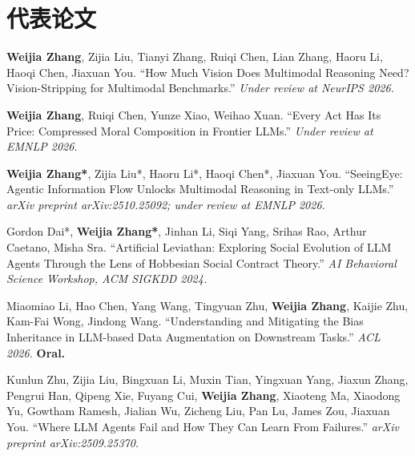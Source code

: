 \section{代表论文}
\begin{itemize}[leftmargin=0.15in, label={}]
  \small{
    \item \textbf{Weijia Zhang}, Zijia Liu, Tianyi Zhang, Ruiqi Chen, Lian Zhang, Haoru Li, Haoqi Chen, Jiaxuan You.
    ``How Much Vision Does Multimodal Reasoning Need? Vision-Stripping for Multimodal Benchmarks.''
    \textit{Under review at NeurIPS 2026.}

    \item \textbf{Weijia Zhang}, Ruiqi Chen, Yunze Xiao, Weihao Xuan.
    ``Every Act Has Its Price: Compressed Moral Composition in Frontier LLMs.''
    \textit{Under review at EMNLP 2026.}

    \item \textbf{Weijia Zhang*}, Zijia Liu*, Haoru Li*, Haoqi Chen*, Jiaxuan You.
    ``SeeingEye: Agentic Information Flow Unlocks Multimodal Reasoning in Text-only LLMs.''
    \textit{arXiv preprint arXiv:2510.25092; under review at EMNLP 2026.}

    \item Gordon Dai*, \textbf{Weijia Zhang*}, Jinhan Li, Siqi Yang, Srihas Rao, Arthur Caetano, Misha Sra.
    ``Artificial Leviathan: Exploring Social Evolution of LLM Agents Through the Lens of Hobbesian Social Contract Theory.''
    \textit{AI Behavioral Science Workshop, ACM SIGKDD 2024.}

    \item Miaomiao Li, Hao Chen, Yang Wang, Tingyuan Zhu, \textbf{Weijia Zhang}, Kaijie Zhu, Kam-Fai Wong, Jindong Wang.
    ``Understanding and Mitigating the Bias Inheritance in LLM-based Data Augmentation on Downstream Tasks.''
    \textit{ACL 2026.} \textbf{Oral.}

    \item Kunlun Zhu, Zijia Liu, Bingxuan Li, Muxin Tian, Yingxuan Yang, Jiaxun Zhang, Pengrui Han, Qipeng Xie,
    Fuyang Cui, \textbf{Weijia Zhang}, Xiaoteng Ma, Xiaodong Yu, Gowtham Ramesh, Jialian Wu, Zicheng Liu, Pan Lu, James Zou, Jiaxuan You.
    ``Where LLM Agents Fail and How They Can Learn From Failures.''
    \textit{arXiv preprint arXiv:2509.25370.}
  }
\end{itemize}

